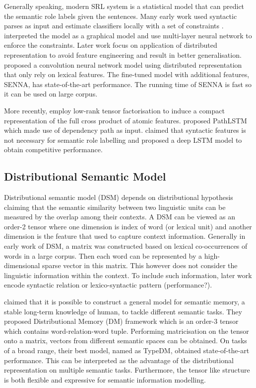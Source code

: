 \documentclass[a4paper]{article}
\begin{document}
Generally speaking, modern SRL system is a statistical model that can predict the semantic role labels given the sentences. Many early work used syntactic parses as input and estimate classifiers locally with a set of constraints \citep{punyakanok2008importance}. \citet{tackstrom2015efficient} interpreted the model as a graphical model and use multi-layer neural network to enforce the constraints. Later work focus on application of distributed representation to avoid feature engineering and result in better generalisation. \citet{collobert2011natural} proposed a convolution neural network model using distributed representation that only rely on lexical features. The fine-tuned model with additional features, SENNA, has state-of-the-art performance. The running time of SENNA is fast so it can be used on large corpus. 

More recently, \citet{lei-EtAl:2015:NAACL-HLT} employ low-rank tensor factorisation to induce a compact representation of the full cross product of atomic features. \citet{roth2016neural} proposed PathLSTM which made use of dependency path as input. \citet{marcheggiani2017simple} claimed that syntactic features is not necessary for semantic role labelling and proposed a deep LSTM model to obtain competitive performance. 


\subsection{Distributional Semantic Model} \label{sec:dsm}
Distributional semantic model (DSM) depends on distributional hypothesis \citep{harris1954distributional, miller1991contextual} claiming that the semantic similarity between two linguistic units can be measured by the overlap among their contexts. A DSM can be viewed as an order-2 tensor where one dimension is index of word (or lexical unit) and another dimension is the feature that used to capture context information. Generally in early work of DSM, a matrix was constructed based on lexical co-occurrences of words in a large corpus. Then each word can be represented by a high-dimensional sparse vector in this matrix. This however does not consider the linguistic information within the context. To include such information, later work encode syntactic relation or lexico-syntactic pattern \citep{pado2007integration, erk2008structured, rothenhausler2009unsupervised} (performance?). 

\citet{baroni2010distributional} claimed that it is possible to construct a general model for semantic memory, a stable long-term knowledge of human, to tackle different semantic tasks. They proposed Distributional Memory (DM) framework which is an order-3 tensor which contains word-relation-word tuple. Performing matricisation on the tensor onto a matrix, vectors from different semantic spaces can be obtained. On tasks of a broad range, their best model, named as TypeDM, obtained state-of-the-art performance. This can be interpreted as the advantage of the distributional representation on multiple semantic tasks. Furthermore, the tensor like structure is both flexible and expressive for semantic information modelling. 
\end{document}
